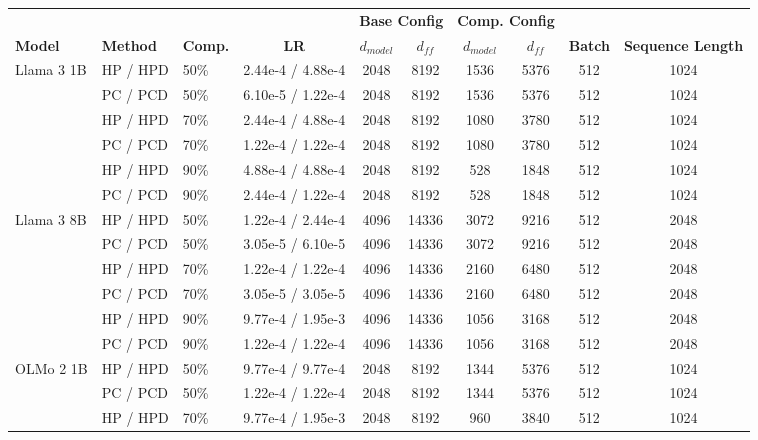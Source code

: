 \begin{table}[h!]
\centering
\small
\setlength{\tabcolsep}{5pt}
\begin{tabular}{lllc|cc|cc|cc}
\toprule
& & & & \multicolumn{2}{c}{\textbf{Base Config}} & \multicolumn{2}{c}{\textbf{Comp. Config}} & & \\
\cmidrule(lr){5-6} \cmidrule(lr){7-8}
\textbf{Model} & \textbf{Method} & \textbf{Comp.} & \textbf{LR} & $d_{model}$ & $d_{ff}$ & $d_{model}$ & $d_{ff}$ & \textbf{Batch} & \textbf{Sequence Length} \\
\midrule
\multirow{6}{*}{Llama 3 1B}
& HP / HPD & 50\% & 2.44e-4 / 4.88e-4 & 2048 & 8192 & 1536 & 5376 & 512 & 1024 \\
& PC / PCD & 50\% & 6.10e-5 / 1.22e-4 & 2048 & 8192 & 1536 & 5376 & 512 & 1024 \\
\cmidrule(l){2-10}
& HP / HPD & 70\% & 2.44e-4 / 4.88e-4 & 2048 & 8192 & 1080 & 3780 & 512 & 1024 \\
& PC / PCD & 70\% & 1.22e-4 / 1.22e-4 & 2048 & 8192 & 1080 & 3780 & 512 & 1024 \\
\cmidrule(l){2-10}
& HP / HPD & 90\% & 4.88e-4 / 4.88e-4 & 2048 & 8192 & 528 & 1848 & 512 & 1024 \\
& PC / PCD & 90\% & 2.44e-4 / 1.22e-4 & 2048 & 8192 & 528 & 1848 & 512 & 1024 \\
\midrule
\multirow{6}{*}{Llama 3 8B}
& HP / HPD & 50\% & 1.22e-4 / 2.44e-4 & 4096 & 14336 & 3072 & 9216 & 512 & 2048 \\
& PC / PCD & 50\% & 3.05e-5 / 6.10e-5 & 4096 & 14336 & 3072 & 9216 & 512 & 2048 \\
\cmidrule(l){2-10}
& HP / HPD & 70\% & 1.22e-4 / 1.22e-4 & 4096 & 14336 & 2160 & 6480 & 512 & 2048 \\
& PC / PCD & 70\% & 3.05e-5 / 3.05e-5 & 4096 & 14336 & 2160 & 6480 & 512 & 2048 \\
\cmidrule(l){2-10}
& HP / HPD & 90\% & 9.77e-4 / 1.95e-3 & 4096 & 14336 & 1056 & 3168 & 512 & 2048 \\
& PC / PCD & 90\% & 1.22e-4 / 1.22e-4 & 4096 & 14336 & 1056 & 3168 & 512 & 2048 \\
\midrule
\multirow{6}{*}{OLMo 2 1B}
& HP / HPD & 50\% & 9.77e-4 / 9.77e-4 & 2048 & 8192 & 1344 & 5376 & 512 & 1024 \\
& PC / PCD & 50\% & 1.22e-4 / 1.22e-4 & 2048 & 8192 & 1344 & 5376 & 512 & 1024 \\
\cmidrule(l){2-10}
& HP / HPD & 70\% & 9.77e-4 / 1.95e-3 & 2048 & 8192 & 960 & 3840 & 512 & 1024 \\

\end{tabular}
\end{table}
